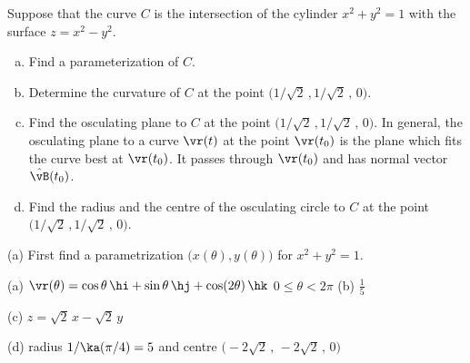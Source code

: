 \begin{question}
Suppose that  the curve $C$ is the intersection of the cylinder $x^2 +y^2 = 1$ 
with the surface  $z =x^2 - y^2$.
\begin{enumerate}[(a)]
\item 
Find a parameterization of $C$.

\item
Determine the curvature of $C$ at the point
            $\big(1/\sqrt{2}\,,1/\sqrt{2}\,,\,0\big)$.

\item
Find the osculating plane to $C$ at the point $\big(1/\sqrt{2}\,,1/\sqrt{2}\,,\,0\big)$.
In general, the osculating plane to a curve $\vr(t)$ at the point
$\vr(t_0)$ is the plane which fits the curve best at $\vr(t_0)$.
It passes through $\vr(t_0)$ and has normal vector $\hat\vB(t_0)$.

\item 
Find the radius and the centre of the osculating circle to $C$ at the 
point $\big(1/\sqrt{2}\,,1/\sqrt{2}\,,\,0\big)$.
\end{enumerate}
\end{question}

\begin{hint} 
(a) First find a parametrization $\big(x(\theta),y(\theta)\big)$
for  $x^2+y^2=1$.
\end{hint}

\begin{answer} 
(a) $\vr(\theta) =\cos\theta\,\hi +\sin\theta\,\hj + \cos(2\theta)\,\hk$
                        \qquad $0\le\theta<2\pi$\qquad 
(b) $\frac{1}{5}$

(c) $z =\sqrt{2}\,x-\sqrt{2}\,y$

(d) radius $1/\ka(\pi/4)=5$ and centre
            $\big(-2\sqrt{2}\,,\,-2\sqrt{2}\,,\,0\big)$
\end{answer}


